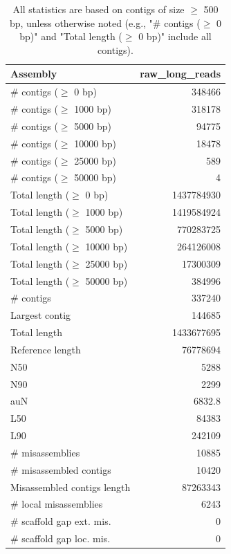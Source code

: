 \documentclass[12pt,a4paper]{article}
\begin{document}
\begin{table}[ht]
\begin{center}
\caption{All statistics are based on contigs of size $\geq$ 500 bp, unless otherwise noted (e.g., "\# contigs ($\geq$ 0 bp)" and "Total length ($\geq$ 0 bp)" include all contigs).}
\begin{tabular}{|l*{1}{|r}|}
\hline
Assembly & raw\_long\_reads \\ \hline
\# contigs ($\geq$ 0 bp) & 348466 \\ \hline
\# contigs ($\geq$ 1000 bp) & 318178 \\ \hline
\# contigs ($\geq$ 5000 bp) & 94775 \\ \hline
\# contigs ($\geq$ 10000 bp) & 18478 \\ \hline
\# contigs ($\geq$ 25000 bp) & 589 \\ \hline
\# contigs ($\geq$ 50000 bp) & 4 \\ \hline
Total length ($\geq$ 0 bp) & 1437784930 \\ \hline
Total length ($\geq$ 1000 bp) & 1419584924 \\ \hline
Total length ($\geq$ 5000 bp) & 770283725 \\ \hline
Total length ($\geq$ 10000 bp) & 264126008 \\ \hline
Total length ($\geq$ 25000 bp) & 17300309 \\ \hline
Total length ($\geq$ 50000 bp) & 384996 \\ \hline
\# contigs & 337240 \\ \hline
Largest contig & 144685 \\ \hline
Total length & 1433677695 \\ \hline
Reference length & 76778694 \\ \hline
N50 & 5288 \\ \hline
N90 & 2299 \\ \hline
auN & 6832.8 \\ \hline
L50 & 84383 \\ \hline
L90 & 242109 \\ \hline
\# misassemblies & 10885 \\ \hline
\# misassembled contigs & 10420 \\ \hline
Misassembled contigs length & 87263343 \\ \hline
\# local misassemblies & 6243 \\ \hline
\# scaffold gap ext. mis. & 0 \\ \hline
\# scaffold gap loc. mis. & 0 \\ \hline

\end{tabular}
\end{center}
\end{table}
\end{document}
